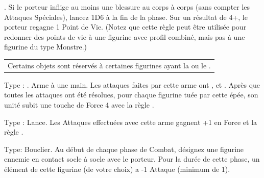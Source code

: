 \begin{multicols}{2}
 . Si le porteur inflige au moins une blessure au corps à corps (sans compter les Attaques Spéciales), lancez 1D6 à la fin de la phase. Sur un résultat de 4+, le porteur regagne 1 Point de Vie. (Notez que cette règle peut être utilisée pour redonner des points de vie à une figurine avec profil combiné, mais pas à une figurine du type Monstre.)

\endpricelist

\end{multicols}

\closearmynewsection



\closearmynewsection

\startarmymagicalitems

\begin{tabular}{c}
{Certains objets sont réservés à certaines figurines ayant 
la \markofthedarkgods{} ou le \giftofthegods{}.}
\end{tabular}

\armymagicalweapons

\startpricelist


{Type : \hw{}. Arme à une main. Les attaques faites par cette arme ont \flamingattacks,  et . Après que toutes les attaques ont été résolues, pour chaque figurine tuée par cette épée, son unité subit une touche de Force 4 avec la règle \flamingattacks.}


{Type : Lance. Les Attaques effectuées avec cette arme gagnent +1 en Force et la règle .}

\endpricelist

\armymagicalarmour

\startpricelist


{Type: Bouclier. Au début de chaque phase de Combat, désignez une figurine ennemie en contact socle à socle avec le porteur. Pour la durée de cette phase, un élément de cette figurine (de votre choix) a -1 Attaque (minimum de 1).}

\endpricelist

\armyarcaneitems

\startpricelist

